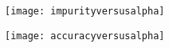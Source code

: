 	\begin{figure}[tbp]
		\begin{minipage}[t]{0.475\textwidth}
			\flushleft
			\texttt{[image: impurityversusalpha]}
		\end{minipage}
		\hfill
		\begin{minipage}[t]{0.475\textwidth}
			\flushright
			\texttt{[image: accuracyversusalpha]}
		\end{minipage}
	\end{figure}



